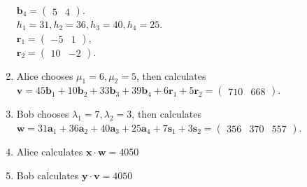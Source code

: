 \begin{enumerate}
	$\textbf{b}_4 = \begin{pmatrix} 5 & 4 \end{pmatrix} $. \\
	$ h_1 = 31, h_2 = 36, h_3 = 40, h_4 = 25 $. \\
	$ \textbf{r}_1 = \begin{pmatrix} -5 & 1 \end{pmatrix}$, \\ 
	$ \textbf{r}_2 = \begin{pmatrix} 10 & -2 \end{pmatrix} $.
	\item Alice chooses $ \mu_1 = 6, \mu_2 = 5 $, then calculates 
	$ \textbf{v} = 45 \textbf{b}_1 + 10 \textbf{b}_2 + 33 \textbf{b}_3 + 39 \textbf{b}_4 + 6 \textbf{r}_1 + 5 \textbf{r}_2 = \begin{pmatrix} 710 & 668 \end{pmatrix}	 $.
	\item Bob chooses $ \lambda_1 = 7, \lambda_2 = 3 $, then calculates \\
	$ \textbf{w} = 31 \textbf{a}_1 + 36 \textbf{a}_2 + 40 \textbf{a}_3 + 25 \textbf{a}_4 + 7 \textbf{s}_1 + 3 \textbf{s}_2 = \begin{pmatrix} 356 & 370 & 557 \end{pmatrix} $.
	\item Alice calculates $ \textbf{x} \cdot \textbf{w} = 4050 $ 
	\item Bob calculates $ \textbf{y} \cdot \textbf{v} = 4050 $
\end{enumerate} 